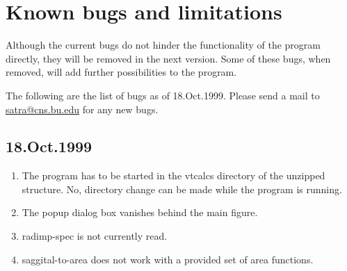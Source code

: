 \chapter{Known bugs and limitations}

Although the current bugs do not hinder the functionality of the
program directly, they will be removed in the next version. Some
of these bugs, when removed, will add further possibilities to the
program.

The following are the list of bugs as of 18.Oct.1999. Please send
a mail to \href{mailto:satra@cns.bu.edu}{satra@cns.bu.edu} for any
new bugs.

\section{18.Oct.1999}
\begin{enumerate}
\item The program has to be started in the vtcalcs directory of the
unzipped structure. No, directory change can be made while the
program is running.
\item The popup dialog box vanishes behind the main figure.
\item radimp-spec is not currently read.
\item saggital-to-area does not work with a provided set of area
functions.
\end{enumerate}
